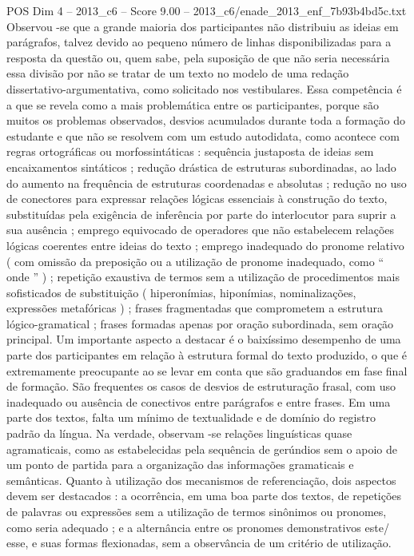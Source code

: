\begin{textsample}{POS Dim 4 – 2013\_c6 – Score 9.00 – 2013\_c6/enade\_2013\_enf\_7b93b4bd5c.txt}
Observou -se que a grande maioria dos participantes não distribuiu as ideias em parágrafos, talvez devido ao pequeno número de linhas disponibilizadas para a resposta da questão ou, quem sabe, pela suposição de que não seria necessária essa divisão por não se tratar de um texto no modelo de uma redação dissertativo-argumentativa, como solicitado nos vestibulares.
Essa competência é a que se revela como a mais problemática entre os participantes, porque são muitos os problemas observados, desvios acumulados durante toda a formação do estudante e que não se resolvem com um estudo autodidata, como acontece com regras ortográficas ou morfossintáticas : sequência justaposta de ideias sem encaixamentos sintáticos ; redução drástica de estruturas subordinadas, ao lado do aumento na frequência de estruturas coordenadas e absolutas ; redução no uso de conectores para expressar relações lógicas essenciais à construção do texto, substituídas pela exigência de inferência por parte do interlocutor para suprir a sua ausência ; emprego equivocado de operadores que não estabelecem relações lógicas coerentes entre ideias do texto ; emprego inadequado do pronome relativo ( com omissão da preposição ou a utilização de pronome inadequado, como “ onde ” ) ; repetição exaustiva de termos sem a utilização de procedimentos mais sofisticados de substituição ( hiperonímias, hiponímias, nominalizações, expressões metafóricas ) ; frases fragmentadas que comprometem a estrutura lógico-gramatical ; frases formadas apenas por oração subordinada, sem oração principal.
Um importante aspecto a destacar é o baixíssimo desempenho de uma parte dos participantes em relação à estrutura formal do texto produzido, o que é extremamente preocupante ao se levar em conta que são graduandos em fase final de formação.
São frequentes os casos de desvios de estruturação frasal, com uso inadequado ou ausência de conectivos entre parágrafos e entre frases.
Em uma parte dos textos, falta um mínimo de textualidade e de domínio do registro padrão da língua.
Na verdade, observam -se relações linguísticas quase agramaticais, como as estabelecidas pela sequência de gerúndios sem o apoio de um ponto de partida para a organização das informações gramaticais e semânticas.
Quanto à utilização dos mecanismos de referenciação, dois aspectos devem ser destacados : a ocorrência, em uma boa parte dos textos, de repetições de palavras ou expressões sem a utilização de termos sinônimos ou pronomes, como seria adequado ; e a alternância entre os pronomes demonstrativos este/ esse, e suas formas flexionadas, sem a observância de um critério de utilização.

\end{textsample}
